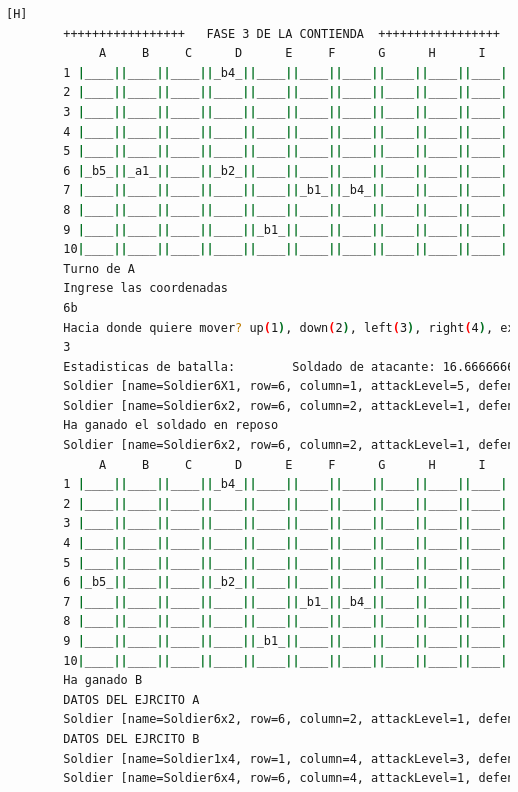 \documentclass{article}
\begin{document}
\begin{lstlisting}[language=bash,caption={Compilando y probando el programa completo  }][H]
		+++++++++++++++++   FASE 3 DE LA CONTIENDA  +++++++++++++++++
			 A     B     C      D      E     F      G      H      I     J 
		1 |____||____||____||_b4_||____||____||____||____||____||____|
		2 |____||____||____||____||____||____||____||____||____||____|
		3 |____||____||____||____||____||____||____||____||____||____|
		4 |____||____||____||____||____||____||____||____||____||____|
		5 |____||____||____||____||____||____||____||____||____||____|
		6 |_b5_||_a1_||____||_b2_||____||____||____||____||____||____|
		7 |____||____||____||____||____||_b1_||_b4_||____||____||____|
		8 |____||____||____||____||____||____||____||____||____||____|
		9 |____||____||____||____||_b1_||____||____||____||____||____|
		10|____||____||____||____||____||____||____||____||____||____|
		Turno de A
		Ingrese las coordenadas
		6b
		Hacia donde quiere mover? up(1), down(2), left(3), right(4), exit(5)
		3
		Estadisticas de batalla:        Soldado de atacante: 16.666666666666668%        Soldado en reposo: 83.33333333333333    Salio como aleatorio: 82.79657290860615
		Soldier [name=Soldier6X1, row=6, column=1, attackLevel=5, defenseLevel=5, actualLife=5, speed=2, attitude=offensive, current=true]
		Soldier [name=Soldier6x2, row=6, column=2, attackLevel=1, defenseLevel=5, actualLife=1, speed=1, attitude=offensive, current=true]
		Ha ganado el soldado en reposo
		Soldier [name=Soldier6x2, row=6, column=2, attackLevel=1, defenseLevel=5, actualLife=1, speed=1, attitude=offensive, current=true]
			 A     B     C      D      E     F      G      H      I     J 
		1 |____||____||____||_b4_||____||____||____||____||____||____|
		2 |____||____||____||____||____||____||____||____||____||____|
		3 |____||____||____||____||____||____||____||____||____||____|
		4 |____||____||____||____||____||____||____||____||____||____|
		5 |____||____||____||____||____||____||____||____||____||____|
		6 |_b5_||____||____||_b2_||____||____||____||____||____||____|
		7 |____||____||____||____||____||_b1_||_b4_||____||____||____|
		8 |____||____||____||____||____||____||____||____||____||____|
		9 |____||____||____||____||_b1_||____||____||____||____||____|
		10|____||____||____||____||____||____||____||____||____||____|
		Ha ganado B
		DATOS DEL EJRCITO A
		Soldier [name=Soldier6x2, row=6, column=2, attackLevel=1, defenseLevel=5, actualLife=1, speed=1, attitude=offensive, current=true]
		DATOS DEL EJRCITO B
		Soldier [name=Soldier1x4, row=1, column=4, attackLevel=3, defenseLevel=3, actualLife=4, speed=0, attitude=Repose, current=true]
		Soldier [name=Soldier6x4, row=6, column=4, attackLevel=1, defenseLevel=4, actualLife=2, speed=0, attitude=Repose, current=true]

\end{lstlisting}
\end{document}
